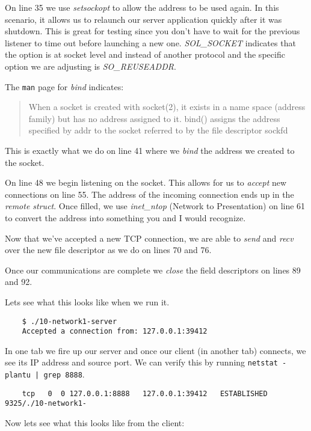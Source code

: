 \documentclass[../main.tex]{subfiles}
\begin{document}
	On line 35 we use \textit{setsockopt} to allow the address to be used again.  In this scenario, it allows us to relaunch our server application quickly after it was shutdown.  This is great for testing since you don't have to wait for the previous listener to time out before launching a new one.  \textit{SOL\_SOCKET} indicates that the option is at socket level and instead of another protocol and the specific option we are adjusting is \textit{SO\_REUSEADDR}.
	
	The \texttt{man} page for \textit{bind} indicates:
	\begin{quotation}
		When a socket is created with socket(2), it exists in a name space (address family) but has no address assigned to it.  bind() assigns the address specified by addr to the socket referred to by the file descriptor sockfd
	\end{quotation}
	This is exactly what we do on line 41 where we \textit{bind} the address we created to the socket.
	
	On line 48 we begin listening on the socket.  This allows for us to \textit{accept} new connections on line 55.  The address of the incoming connection ends up in the \textit{remote struct}.  Once filled, we use \textit{inet\_ntop} (Network to Presentation) on line 61 to convert the address into something you and I would recognize.
	
	Now that we've accepted a new TCP connection, we are able to \textit{send} and \textit{recv} over the new file descriptor as we do on lines 70 and 76.
	
	Once our communications are complete we \textit{close} the field descriptors on lines 89 and 92.
	
	Lets see what this looks like when we run it.
	
	\begin{verbatim}
	$ ./10-network1-server 
	Accepted a connection from: 127.0.0.1:39412
	\end{verbatim}
	
	In one tab we fire up our server and once our client (in another tab) connects, we see its IP address and source port.  We can verify this by running \texttt{netstat -plantu | grep 8888}.  
	
	\begin{verbatim}
	tcp   0  0 127.0.0.1:8888   127.0.0.1:39412   ESTABLISHED 9325/./10-network1- 
	\end{verbatim}
	
	Now lets see what this looks like from the client:
	
\end{document}
